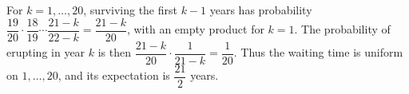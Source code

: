 For $k=1,\ldots,20$, surviving the first $k-1$ years has probability $\dfrac{19}{20}\cdot\dfrac{18}{19}\cdots\dfrac{21-k}{22-k}=\dfrac{21-k}{20}$, with an empty product for $k=1$. The probability of erupting in year $k$ is then $\dfrac{21-k}{20}\cdot\dfrac{1}{21-k}=\dfrac{1}{20}$. Thus the waiting time is uniform on $1,\ldots,20$, and its expectation is $\boxed{\dfrac{21}{2}}$ years.
